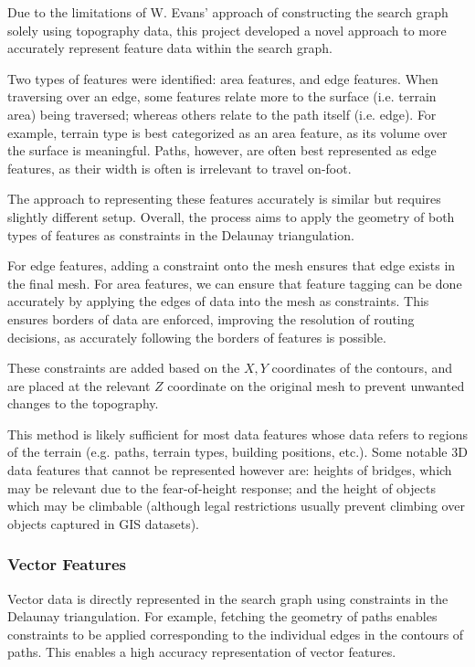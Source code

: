 \documentclass[12pt]{article}
\begin{document}
Due to the limitations of W. Evans' approach of constructing the search graph solely using topography data, this project developed a novel approach to more accurately represent feature data within the search graph.

Two types of features were identified: area features, and edge features. When traversing over an edge, some features relate more to the surface (i.e. terrain area) being traversed; whereas others relate to the path itself (i.e. edge). For example, terrain type is best categorized as an area feature, as its volume over the surface is meaningful. Paths, however, are often best represented as edge features, as their width is often is irrelevant to travel on-foot.

The approach to representing these features accurately is similar but requires slightly different setup. Overall, the process aims to apply the geometry of both types of features as constraints in the Delaunay triangulation.

For edge features, adding a constraint onto the mesh ensures that edge exists in the final mesh. For area features, we can ensure that feature tagging can be done accurately by applying the edges of data into the mesh as constraints. This ensures borders of data are enforced, improving the resolution of routing decisions, as accurately following the borders of features is possible.

These constraints are added based on the $X,Y$ coordinates of the contours, and are placed at the relevant $Z$ coordinate on the original mesh to prevent unwanted changes to the topography.

This method is likely sufficient for most data features whose data refers to regions of the terrain (e.g. paths, terrain types, building positions, etc.). Some notable 3D data features that cannot be represented however are: heights of bridges, which may be relevant due to the fear-of-height response; and the height of objects which may be climbable (although legal restrictions usually prevent climbing over objects captured in GIS datasets).

\subsubsection{Vector Features}

Vector data is directly represented in the search graph using constraints in the Delaunay triangulation. For example, fetching the geometry of paths enables constraints to be applied corresponding to the individual edges in the contours of paths. This enables a high accuracy representation of vector features.
\end{document}
